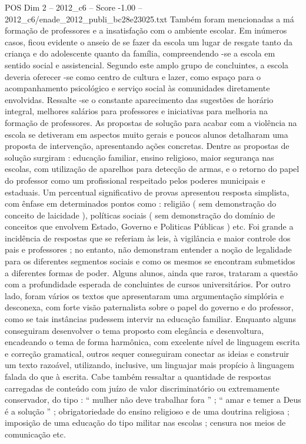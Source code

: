 \begin{textsample}{POS Dim 2 – 2012\_c6 – Score -1.00 – 2012\_c6/enade\_2012\_publi\_bc28e23025.txt}
Também foram mencionadas a má formação de professores e a insatisfação com o ambiente escolar.
Em inúmeros casos, ficou evidente o anseio de se fazer da escola um lugar de resgate tanto da criança e do adolescente quanto da família, compreendendo -se a escola em sentido social e assistencial.
Segundo este amplo grupo de concluintes, a escola deveria oferecer -se como centro de cultura e lazer, como espaço para o acompanhamento psicológico e serviço social às comunidades diretamente envolvidas.
Ressalte -se o constante aparecimento das sugestões de horário integral, melhores salários para professores e iniciativas para melhoria na formação de professores.
As propostas de solução para acabar com a violência na escola se detiveram em aspectos muito gerais e poucos alunos detalharam uma proposta de intervenção, apresentando ações concretas.
Dentre as propostas de solução surgiram : educação familiar, ensino religioso, maior segurança nas escolas, com utilização de aparelhos para detecção de armas, e o retorno do papel do professor como um profissional respeitado pelos poderes municipais e estaduais.
Um percentual significativo de provas apresentou resposta simplista, com ênfase em determinados pontos como : religião ( sem demonstração do conceito de laicidade ), políticas sociais ( sem demonstração do domínio de conceitos que envolvem Estado, Governo e Politicas Públicas ) etc.
Foi grande a incidência de respostas que se referiam às leis, à vigilância e maior controle dos pais e professores ; no entanto, não demonstram entender a noção de legalidade para os diferentes segmentos sociais e como os mesmos se encontram submetidos a diferentes formas de poder.
Alguns alunos, ainda que raros, trataram a questão com a profundidade esperada de concluintes de cursos universitários.
Por outro lado, foram vários os textos que apresentaram uma argumentação simplória e desconexa, com forte visão paternalista sobre o papel do governo e do professor, como se tais instâncias pudessem intervir na educação familiar.
Enquanto alguns conseguiram desenvolver o tema proposto com elegância e desenvoltura, encadeando o tema de forma harmônica, com excelente nível de linguagem escrita e correção gramatical, outros sequer conseguiram conectar as ideias e construir um texto razoável, utilizando, inclusive, um linguajar mais propício à linguagem falada do que à escrita.
Cabe também ressaltar a quantidade de respostas carregadas de conteúdo com juízo de valor discriminatório ou extremamente conservador, do tipo : “ mulher não deve trabalhar fora ” ; “ amar e temer a Deus é a solução ” ; obrigatoriedade do ensino religioso e de uma doutrina religiosa ; imposição de uma educação do tipo militar nas escolas ; censura nos meios de comunicação etc.

\end{textsample}
